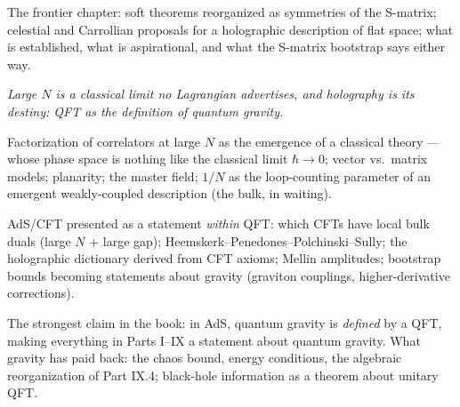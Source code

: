 The frontier chapter: soft theorems reorganized as symmetries of the S-matrix; celestial and Carrollian proposals for a holographic description of flat space; what is established, what is aspirational, and what the S-matrix bootstrap says either way.


\noin \emph{Large $N$ is a classical limit no Lagrangian advertises, and holography is its destiny: QFT as the definition of quantum gravity.}

Factorization of correlators at large $N$ as the emergence of a classical theory --- whose phase space is nothing like the classical limit $\hbar \to 0$; vector vs.\ matrix models; planarity; the master field; $1/N$ as the loop-counting parameter of an emergent weakly-coupled description (the bulk, in waiting).

AdS/CFT presented as a statement \emph{within} QFT: which CFTs have local bulk duals (large $N$ + large gap); Heemskerk--Penedones--Polchinski--Sully; the holographic dictionary derived from CFT axioms; Mellin amplitudes; bootstrap bounds becoming statements about gravity (graviton couplings, higher-derivative corrections).

The strongest claim in the book: in AdS, quantum gravity is \emph{defined} by a QFT, making everything in Parts I--IX a statement about quantum gravity. What gravity has paid back: the chaos bound, energy conditions, the algebraic reorganization of Part IX.4; black-hole information as a theorem about unitary QFT.


